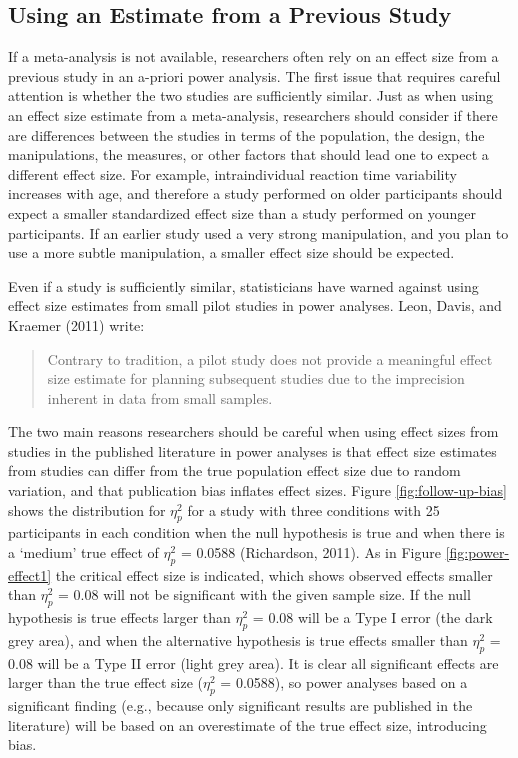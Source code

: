 \documentclass[
  english,
  ,jou, a4paper,floatsintext]{apa6}
\begin{document}
\hypertarget{using-an-estimate-from-a-previous-study}{%
\subsection{Using an Estimate from a Previous Study}\label{using-an-estimate-from-a-previous-study}}

If a meta-analysis is not available, researchers often rely on an effect size from a previous study in an a-priori power analysis. The first issue that requires careful attention is whether the two studies are sufficiently similar. Just as when using an effect size estimate from a meta-analysis, researchers should consider if there are differences between the studies in terms of the population, the design, the manipulations, the measures, or other factors that should lead one to expect a different effect size. For example, intraindividual reaction time variability increases with age, and therefore a study performed on older participants should expect a smaller standardized effect size than a study performed on younger participants. If an earlier study used a very strong manipulation, and you plan to use a more subtle manipulation, a smaller effect size should be expected.

Even if a study is sufficiently similar, statisticians have warned against using effect size estimates from small pilot studies in power analyses. Leon, Davis, and Kraemer (2011) write:

\begin{quote}
Contrary to tradition, a pilot study does not provide a meaningful effect size estimate for planning subsequent studies due to the imprecision inherent in data from small samples.
\end{quote}

The two main reasons researchers should be careful when using effect sizes from studies in the published literature in power analyses is that effect size estimates from studies can differ from the true population effect size due to random variation, and that publication bias inflates effect sizes. Figure \ref{fig:follow-up-bias} shows the distribution for \(\eta_p^2\) for a study with three conditions with 25 participants in each condition when the null hypothesis is true and when there is a `medium' true effect of \(\eta_p^2\) = 0.0588 (Richardson, 2011). As in Figure \ref{fig:power-effect1} the critical effect size is indicated, which shows observed effects smaller than \(\eta_p^2\) = 0.08 will not be significant with the given sample size. If the null hypothesis is true effects larger than \(\eta_p^2\) = 0.08 will be a Type I error (the dark grey area), and when the alternative hypothesis is true effects smaller than \(\eta_p^2\) = 0.08 will be a Type II error (light grey area). It is clear all significant effects are larger than the true effect size (\(\eta_p^2\) = 0.0588), so power analyses based on a significant finding (e.g., because only significant results are published in the literature) will be based on an overestimate of the true effect size, introducing bias.
\end{document}

